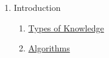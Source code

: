 \clearpage
\renewcommand{\notetitle}{Table of Contents}
\label{toc}
\begin{enumerate}

\item Introduction
\begin{enumerate}
\item \hyperref[202501050802]{Types of Knowledge}
\item \hyperref[202501050821]{Algorithms}
\end{enumerate}
\end{enumerate}

\newpage
